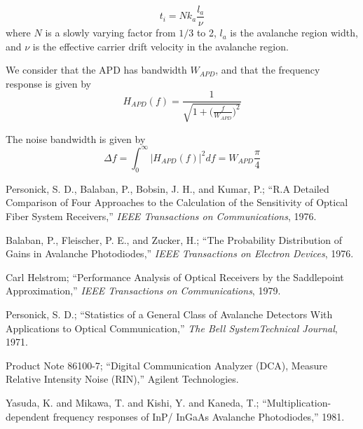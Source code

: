 \documentclass[a4paper]{article}
\begin{document}
\begin{equation}
t_i = Nk_a\frac{l_a}{\nu}
\end{equation}
where $N$ is a slowly varying factor from $1/3$ to 2, $l_a$ is the avalanche region width, and $\nu$ is the effective carrier drift velocity in the avalanche region.

We consider that the APD has bandwidth $W_{APD}$, and that the frequency response is given by
\begin{equation}
H_{APD}(f) = \frac{1}{\sqrt{1 + \bigg(\frac{f}{W_{APD}}\bigg)^2}}
\end{equation}

The noise bandwidth is given by
\begin{equation}
\Delta f = \int_{0}^{\infty} |H_{APD}(f)|^2 df = W_{APD}\frac{\pi}{4}
\end{equation}

\begin{thebibliography}{9}
 Personick, S. D., Balaban, P., Bobsin, J. H., and Kumar, P.; ``R.A Detailed Comparison of Four Approaches to the Calculation of the Sensitivity of Optical Fiber System Receivers,'' \emph{IEEE Transactions on Communications}, 1976.

 Balaban, P., Fleischer, P. E., and Zucker, H.; ``The Probability Distribution of Gains in Avalanche Photodiodes,'' \emph{IEEE Transactions on Electron Devices}, 1976.

 Carl Helstrom; ``Performance Analysis of Optical Receivers by the Saddlepoint Approximation,'' \emph{IEEE Transactions on Communications}, 1979.

 Personick, S. D.; ``Statistics of a General Class of Avalanche Detectors With Applications to Optical Communication,'' \emph{The Bell SystemTechnical Journal}, 1971.

 Product Note 86100-7; ``Digital Communication Analyzer (DCA), Measure Relative Intensity Noise (RIN),'' Agilent Technologies. 

 Yasuda, K. and Mikawa, T. and Kishi, Y. and Kaneda, T.; ``Multiplication-dependent frequency responses of InP/ InGaAs Avalanche Photodiodes,'' 1981.



\end{thebibliography}
\end{document}

